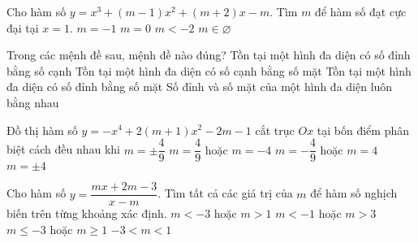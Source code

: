 \begin{ex}%
Cho hàm số $y=x^{3}+(m-1)x^{2}+(m+2)x-m$. Tìm $m$ để hàm số đạt cực đại tại $x=1$.
\choice
{$m=-1$}
{$m=0$}
{$m<-2$}
{\True $m\in\varnothing$}
\end{ex}
\begin{ex}%
{
\hspace*{0.5cm}
}
\end{ex}
\begin{ex}%
Trong các mệnh đề sau, mệnh đề nào đúng?
\choice
{Tồn tại một hình đa diện có số đỉnh bằng số cạnh}
{Tồn tại một hình đa diện có số cạnh bằng số mặt}
{\True Tồn tại một hình đa diện có số đỉnh bằng số mặt}
{Số đỉnh và số mặt của một hình đa diện luôn bằng nhau}
\end{ex}
\begin{ex}%
Đồ thị hàm số $y=-x^{4}+2(m+1)x^{2}-2m-1$ cắt trục $Ox$ tại bốn điểm phân biệt cách đều nhau khi
\choice
{$m=\pm\dfrac{4}{9}$}
{$m=\dfrac{4}{9}$ hoặc $m=-4$}
{\True $m=-\dfrac{4}{9}$ hoặc $m=4$}
{$m=\pm4$}
\end{ex}
\begin{ex}%
Cho hàm số $y=\dfrac{mx+2m-3}{x-m}$. Tìm tất cả các giá trị của $m$ để hàm số nghịch biến trên từng khoảng xác định.
\choice
{\True $m<-3$ hoặc $m>1$}
{$m<-1$ hoặc $m>3$}
{$m\leq -3$ hoặc $m\geq 1$}
{$-3<m<1$}
\end{ex}
